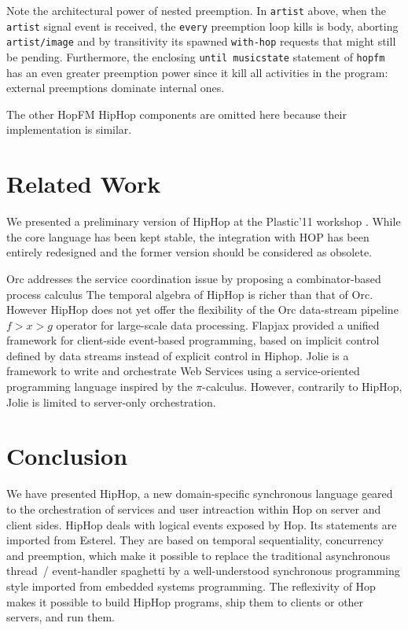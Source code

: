 \documentclass{llncs}
\begin{document}
\noindent 
Note the architectural power of nested preemption.  In
\texttt{artist{}} above, when the {\texttt{artist}} signal
event is received, the \texttt{every{}} preemption loop kills
is body, aborting \texttt{artist/image{}} and by transitivity
its spawned {\texttt{with-hop{}}} requests that might still be
pending. Furthermore, the enclosing
\texttt{until{}\ musicstate} statement of
\texttt{hopfm{}} has an even greater preemption power since it kill
all activities in the program: external preemptions dominate internal ones.

The other HopFM HipHop components are omitted here because their
implementation is similar.

\section{Related Work}
\label{Related works}

We presented a  preliminary version of HipHop at the Plastic'11 workshop
\cite{bns:plastic11}. While the core language has been kept stable, the
integration with HOP has been entirely redesigned and the former
version should be considered as obsolete. 

Orc \cite{KitchinCookMisra2006a} addresses the service coordination
issue by proposing a combinator-based process calculus The temporal
algebra of HipHop is richer than that of Orc. However HipHop does not
yet offer the flexibility of the Orc data-stream pipeline $f>x>g$
operator for large-scale data processing.  Flapjax
\cite{Meyerovich:2009:FPL} provided a unified framework for
client-side event-based programming, based on implicit control defined
by data streams instead of explicit control in Hiphop.  Jolie
\cite{DBLP:journals/entcs/MontesiGLZ07} is a framework to write and
orchestrate Web Services using a service-oriented programming language
inspired by the $\pi$-calculus. However, contrarily to HipHop, Jolie is limited to
server-only orchestration.



\section{Conclusion}
\label{Conclusion}

We have presented HipHop, a new domain-specific synchronous language  
geared to the orchestration of services and user intreaction
within Hop on server and client sides. HipHop deals with logical
events exposed by Hop. Its statements are imported from
Esterel. They are based on temporal sequentiality, concurrency and
preemption, which make it possible to replace the
traditional asynchronous thread~/ event-handler spaghetti \cite{Lee2006} 
by a well-understood 
synchronous programming style imported from embedded systems
programming. The reflexivity of Hop makes it possible to build HipHop programs,
ship them to clients or other servers, and run them. 
\end{document}
